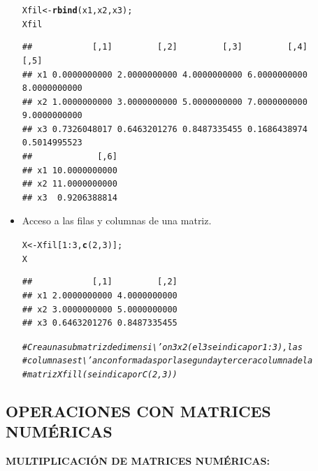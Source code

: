 \documentclass[12pt,letterpaper]{article}\usepackage[]{graphicx}\usepackage[]{color}
\makeatletter
\newcommand{\hlnum}[1]{\textcolor[rgb]{0.686,0.059,0.569}{#1}}%
\newcommand{\hlcom}[1]{\textcolor[rgb]{0.678,0.584,0.686}{\textit{#1}}}%
\newcommand{\hlopt}[1]{\textcolor[rgb]{0,0,0}{#1}}%
\newcommand{\hlstd}[1]{\textcolor[rgb]{0.345,0.345,0.345}{#1}}%
\newcommand{\hlkwb}[1]{\textcolor[rgb]{0.69,0.353,0.396}{#1}}%
\newcommand{\hlkwd}[1]{\textcolor[rgb]{0.737,0.353,0.396}{\textbf{#1}}}%
\newenvironment{kframe}{%
 \def\at@end@of@kframe{}%
 \ifinner\ifhmode%
  \def\at@end@of@kframe{\end{minipage}}%
  \begin{minipage}{\columnwidth}%
 \fi\fi%
 \def\FrameCommand##1{\hskip\@totalleftmargin \hskip-\fboxsep
 \colorbox{shadecolor}{##1}\hskip-\fboxsep
     \hskip-\linewidth \hskip-\@totalleftmargin \hskip\columnwidth}%
 \MakeFramed {\advance\hsize-\width
   \@totalleftmargin\z@ \linewidth\hsize
   \@setminipage}}%
 {\par\unskip\endMakeFramed%
 \at@end@of@kframe}
\newenvironment{knitrout}{}{} %
\makeatother
\begin{document}
\begin{itemize}
\begin{knitrout}
\color{fgcolor}\begin{kframe}
\begin{alltt}
\hlstd{Xfil} \hlkwb{<-} \hlkwd{rbind}\hlstd{(x1, x2, x3);}
\hlstd{Xfil}
\end{alltt}
\begin{verbatim}
##            [,1]         [,2]         [,3]         [,4]         [,5]
## x1 0.0000000000 2.0000000000 4.0000000000 6.0000000000 8.0000000000
## x2 1.0000000000 3.0000000000 5.0000000000 7.0000000000 9.0000000000
## x3 0.7326048017 0.6463201276 0.8487335455 0.1686438974 0.5014995523
##             [,6]
## x1 10.0000000000
## x2 11.0000000000
## x3  0.9206388814
\end{verbatim}
\end{kframe}
\end{knitrout}
\item Acceso a las filas y columnas de una matriz.
\begin{knitrout}
\color{fgcolor}\begin{kframe}
\begin{alltt}
\hlstd{X} \hlkwb{<-} \hlstd{Xfil[}\hlnum{1}\hlopt{:}\hlnum{3}\hlstd{,} \hlkwd{c}\hlstd{(}\hlnum{2}\hlstd{,} \hlnum{3}\hlstd{)];}
\hlstd{X}
\end{alltt}
\begin{verbatim}
##            [,1]         [,2]
## x1 2.0000000000 4.0000000000
## x2 3.0000000000 5.0000000000
## x3 0.6463201276 0.8487335455
\end{verbatim}
\begin{alltt}
\hlcom{# Crea una submatriz de dimensi\textbackslash{}'on 3x2 (el 3 se indica por 1:3), las}
\hlcom{# columnas est\textbackslash{}'an conformadas por la segunda y tercera columna de la }
\hlcom{# matriz Xfill (se indica por C(2,3))}
\end{alltt}
\end{kframe}
\end{knitrout}
\end{itemize}

\subsection{OPERACIONES CON MATRICES NUM\'ERICAS}

\textbf {MULTIPLICACI\'ON DE MATRICES NUM\'ERICAS:}
\end{document}
